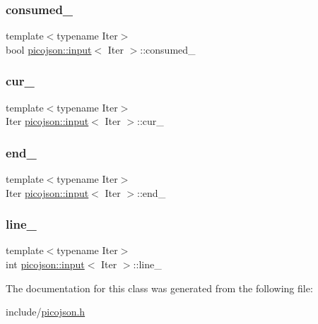 \subsubsection{\texorpdfstring{consumed\+\_\+}{consumed\_}}
{\footnotesize\ttfamily template$<$typename Iter$>$ \\
bool \hyperlink{classpicojson_1_1input}{picojson\+::input}$<$ Iter $>$\+::consumed\+\_\+\hspace{0.3cm}{\ttfamily [protected]}}

\hypertarget{classpicojson_1_1input_afb97b3422a91d0f3388527a5999c8174}{}\label{classpicojson_1_1input_afb97b3422a91d0f3388527a5999c8174} 
\subsubsection{\texorpdfstring{cur\+\_\+}{cur\_}}
{\footnotesize\ttfamily template$<$typename Iter$>$ \\
Iter \hyperlink{classpicojson_1_1input}{picojson\+::input}$<$ Iter $>$\+::cur\+\_\+\hspace{0.3cm}{\ttfamily [protected]}}

\hypertarget{classpicojson_1_1input_acb4fd4c90d1b0db37bc32ccae16361ab}{}\label{classpicojson_1_1input_acb4fd4c90d1b0db37bc32ccae16361ab} 
\subsubsection{\texorpdfstring{end\+\_\+}{end\_}}
{\footnotesize\ttfamily template$<$typename Iter$>$ \\
Iter \hyperlink{classpicojson_1_1input}{picojson\+::input}$<$ Iter $>$\+::end\+\_\+\hspace{0.3cm}{\ttfamily [protected]}}

\hypertarget{classpicojson_1_1input_a7bbb41c7f78ffc19d3219e38c2858b74}{}\label{classpicojson_1_1input_a7bbb41c7f78ffc19d3219e38c2858b74} 
\subsubsection{\texorpdfstring{line\+\_\+}{line\_}}
{\footnotesize\ttfamily template$<$typename Iter$>$ \\
int \hyperlink{classpicojson_1_1input}{picojson\+::input}$<$ Iter $>$\+::line\+\_\+\hspace{0.3cm}{\ttfamily [protected]}}



The documentation for this class was generated from the following file\+:\begin{DoxyCompactItemize}
\item 
include/\hyperlink{picojson_8h}{picojson.\+h}\end{DoxyCompactItemize}
